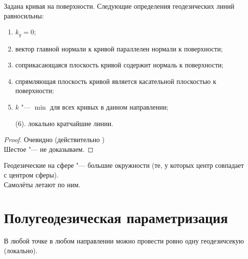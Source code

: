 \begin{theorem}
	Задана кривая на поверхности. Следующие определения геодезических линий равносильны:
	\begin{enumerate}
		\item\label{en:geo:1} $ k_g = 0 $;
		\item\label{en:geo:2} вектор главной нормали к кривой параллелен нормали к поверхности;
		\item\label{en:geo:3} соприкасающаяся плоскость кривой содержит нормаль к поверхности;
		\item\label{en:geo:4} спрямляющая плоскость кривой является касательной плоскостью к поверхности;
		\item\label{en:geo:5} $ k $ "--- $ \min $ для всех кривых в данном направлении;
		\item[(6).]\label{en:geo:6} локально кратчайшие линии.
	\end{enumerate}
\end{theorem}

\begin{proof}
	Очевидно (действительно ) \\
	Шестое "--- не доказываем.
\end{proof}

\begin{eg}
	Геодезические на сфере "--- большие окружности (те, у которых центр совпадает с центром сферы). \\
	Самолёты летают по ним.
\end{eg}

\section{Полугеодезическая параметризация}

\begin{theorem}
	В любой точке в любом направлении можно провести ровно одну геодезичсекую (локально).
\end{theorem}

